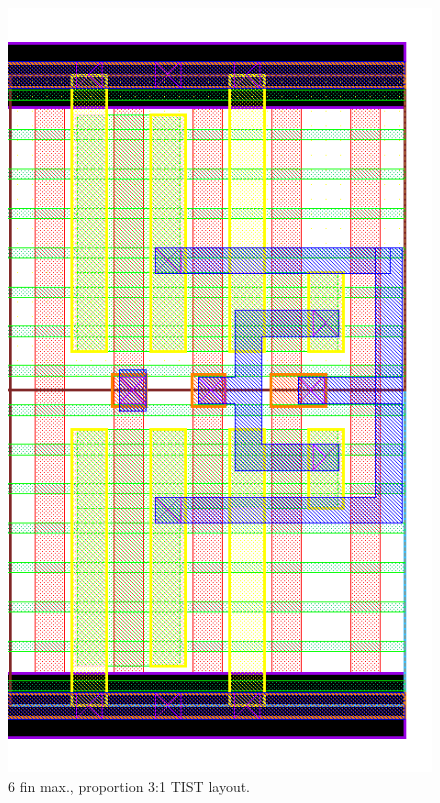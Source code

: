 \documentclass[pgmicro,mestrado,english]{iiufrgs}
\begin{document}
\begin{figure}[]
\centering
\includegraphics[width=\textwidth,height=\textheight,keepaspectratio]{TIST6F2F.png}
\caption{6 fin max., proportion 3:1 TIST layout.}
\label{fig:TIST4F}
\end{figure}
\end{document}

